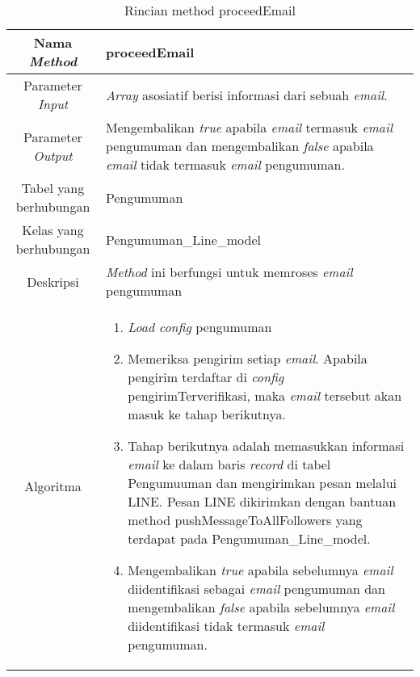 \begin{center}
	\begin{table}[H]
	\caption{Rincian method proceedEmail}
	\label{table:pengumuman-model-proceedemail}
\begin{tabular}{|c|p{11cm}|}
\hline
Nama \textit{Method} 	& 	 proceedEmail	\\
\hline
Parameter \textit{Input} & \textit{Array} asosiatif berisi informasi dari sebuah \textit{email}. \\
\hline
Parameter \textit{Output} & Mengembalikan \textit{true} apabila \textit{email} termasuk \textit{email} pengumuman dan mengembalikan \textit{false} apabila \textit{email} tidak termasuk \textit{email} pengumuman.  \\
\hline
Tabel yang berhubungan & Pengumuman \\
\hline
Kelas yang berhubungan &  Pengumuman\_Line\_model \\
\hline
Deskripsi	& \textit{Method} ini berfungsi untuk memroses \textit{email} pengumuman\\
\hline
Algoritma	& \begin{enumerate}
				\item \textit{Load config} pengumuman
				\item Memeriksa pengirim setiap \textit{email}. Apabila pengirim terdaftar di \textit{config} pengirimTerverifikasi, maka \textit{email} tersebut akan masuk ke tahap berikutnya.
				\item Tahap berikutnya adalah memasukkan informasi \textit{email} ke dalam baris \textit{record} di tabel Pengumuuman dan mengirimkan pesan melalui LINE. Pesan LINE dikirimkan dengan bantuan method pushMessageToAllFollowers yang terdapat pada Pengumuman\_Line\_model.
				\item Mengembalikan \textit{true} apabila sebelumnya \textit{email} diidentifikasi sebagai  \textit{email} pengumuman dan mengembalikan \textit{false} apabila sebelumnya \textit{email} diidentifikasi tidak termasuk \textit{email} pengumuman.
				\end{enumerate} \\
\hline
\end{tabular}
\end{table}
\end{center}

